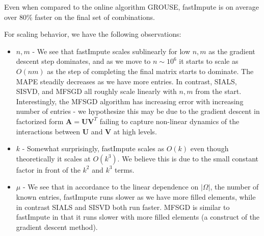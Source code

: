 \documentclass[twoside,11pt]{article}
\begin{document}
\begin{table}[t]
\centering
{}
\caption{Average performance of fastImpute,  SIALS, SISVD, MFSGD and GROUSE on synthetic trials.  Percentages are computed by averaging over the set of realistic combinations.}
	\label{tbl:result_fastimpute_syn_sum}
\end{table}
Even when compared to the online algorithm GROUSE, fastImpute is on average over $80\%$ faster on the final set of combinations.  

For scaling behavior, we have the following observations:
\begin{itemize}
    \item $n,m$ - We see that fastImpute scales sublinearly for low $n,m$ as the gradient descent step dominates, and as we move to $n\sim 10^6$ it starts to scale as $O(nm)$ as the step of completing the final matrix starts to dominate. The MAPE steadily decreases as we have more entries. In contrast, SIALS, SISVD, and MFSGD all roughly scale linearly with $n,m$ from the start. Interestingly, the MFSGD algorithm has increasing error with increasing number of entries - we hypothesize this may be due to the gradient descent in factorized form $\bm{A}=\bm{U}\bm{V}^T$ failing to capture non-linear dynamics of the interactions between $\bm{U}$ and $\bm{V}$ at high levels.
    \item $k$ - Somewhat surprisingly, fastImpute scales as $O(k)$ even though theoretically it scales at $O(k^3)$. We believe this is due to the small constant factor in front of the $k^2$ and $k^3$ terms.
    \item $\mu$ - We see that in accordance to the linear dependence on $|\Omega|$, the number of known entries, fastImpute runs slower as we have more filled elements, while in contrast SIALS and SISVD both run faster. MFSGD is similar to fastImpute in that it runs slower with more filled elements (a construct of the gradient descent method). 
\end{itemize}
\end{document}
